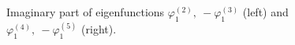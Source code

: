 \documentclass[authoryear]{elsarticle}
\begin{document}
\begin{figure}[htp]
  \begin{center}
\begin{minipage}{0.49\linewidth}
 \\
\end{minipage}
\hfill
\begin{minipage}{0.49\linewidth}
 \\
\end{minipage}
\caption{Imaginary part of eigenfunctions $\varphi^{(2)}_1, \ - \varphi^{(3)}_1$ (left) and $\varphi^{(4)}_1, \ - \varphi^{(5)}_1$ (right).}
\label{fig:9}
  \end{center}
\end{figure}
\end{document}
